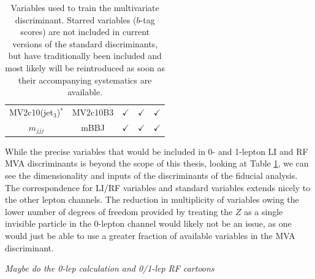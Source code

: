 \begin{table}[!htbp]
\begin{center}
\begin{tabular}{c|cccc}
MV2c10(jet$_{3}$)$^*$ & MV2c10B3 & $\checkmark$ & $\checkmark$ & $\checkmark$ \\
$m_{jjj}$ & mBBJ & $\checkmark$ & $\checkmark$ & $\checkmark$ \\
\hline\hline
\end{tabular}
\caption{Variables used to train the multivariate discriminant. Starred variables ($b$-tag scores) are not included in current versions of the standard discriminants, but have traditionally been included and most likely will be reintroduced as soon as their accompanying systematics are available.
}
\label{tbl:MVAinputs}
\end{center}
\end{table}

While the precise variables that would be included in 0- and 1-lepton LI and RF MVA discriminants is beyond the scope of this thesis, looking at Table \ref{tbl:MVAinputs}, we can see the dimensionality and inputs of the discriminants of the fiducial analysis.  The correspondence for LI/RF variables and standard variables extends nicely to the other lepton channels.  The reduction in multiplicity of variables owing the lower number of degrees of freedom provided by treating the $Z$ as a single invisible particle in the 0-lepton channel would likely not be an issue, as one would just be able to use a greater fraction of available variables in the MVA discriminant.

\emph{Maybe do the 0-lep calculation and 0/1-lep RF cartoons}%

